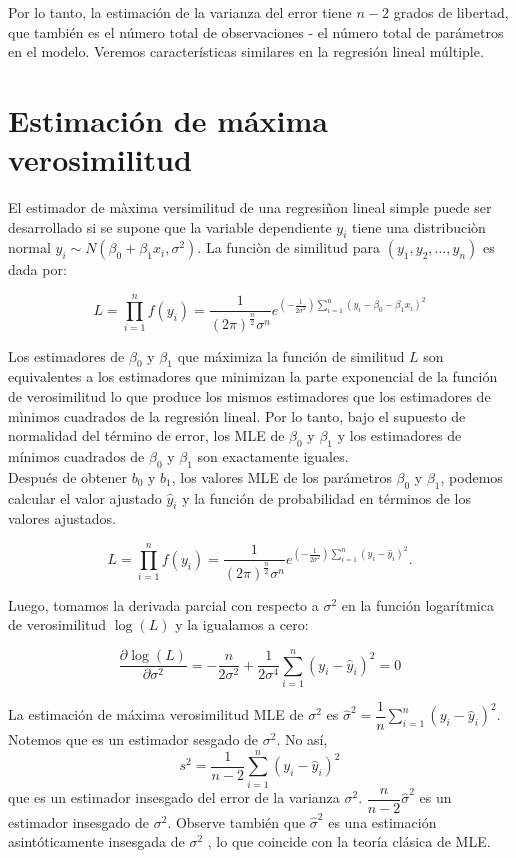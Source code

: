 Por lo tanto, la estimación de la varianza del error tiene $n - 2$ grados de libertad, que también es el número total de observaciones - el número total de parámetros en el modelo. Veremos características similares en la regresión lineal múltiple.


\section{Estimación de máxima verosimilitud}

El estimador de màxima versimilitud de una regresiñon lineal simple puede ser desarrollado si se supone que la variable dependiente $y_i$ tiene una distribuciòn normal $y_i\sim N\left(\beta_0+\beta_1x_i,\sigma^2\right)$. La funciòn de similitud para $\left(y_1,y_2,\ldots,y_n\right)$ es dada por:

$$L=\prod_{i=1}^n f\left(y_i\right)=\dfrac{1}{(2\pi)^{\frac{n}{2}}\sigma^n}e^{\left(-\frac{1}{2\sigma^2}\right)\sum\limits_{i=1}^n \left(y_i-\beta_0-\beta_1x_i\right)^2}$$

Los estimadores de $\beta_0$ y $\beta_1$ que máximiza la función de similitud $L$ son equivalentes a los estimadores que minimizan la parte exponencial de la función de verosimilitud lo que produce los mismos estimadores que los estimadores de mìnimos cuadrados de la regresión lineal. Por lo tanto, bajo el supuesto de normalidad del término de error, los MLE de $\beta_0$ y $\beta_1$ y los estimadores de mínimos cuadrados de $\beta_0$ y $\beta_1$ son exactamente iguales.\\

Después de obtener $b_0$ y $b_1$, los valores MLE de los parámetros $\beta_0$ y $\beta_1$, podemos calcular el valor ajustado $\hat{y}_i$ y la función de probabilidad en términos de los valores ajustados.

$$L=\prod_{i=1}^n f\left(y_i\right)=\dfrac{1}{(2\pi)^{\frac{n}{2}}\sigma^n}e^{\left(-\frac{1}{2\sigma^2}\right)\sum\limits_{i=1}^n \left(y_i-\hat{y}_i\right)^2}.$$

Luego, tomamos la derivada parcial con respecto a $\sigma^2$ en la función logarítmica de verosimilitud $\log(L)$ y la igualamos a cero:

$$\dfrac{\partial \log(L)}{\partial \sigma^2}=-\dfrac{n}{2\sigma^2}+\dfrac{1}{2\sigma^4}\sum_{i=1}^n \left(y_i-\hat{y}_i\right)^2=0$$

La estimación de máxima verosimilitud MLE de $\sigma^2$ es $\hat{\sigma}^2=\dfrac{1}{n}\displaystyle\sum_{i=1}^n\left(y_i-\hat{y}_i\right)^2$. Notemos que es un estimador sesgado de $\sigma^2$. No así, 
$$s^2=\dfrac{1}{n-2}\displaystyle\sum_{i=1}^n\left(y_i-\hat{y}_i\right)^2$$ 
que es un estimador insesgado del error de la varianza $\sigma^2$. $\dfrac{n}{n-2}\hat{\sigma}^2$ es un estimador insesgado de $\sigma^2$. Observe también  que $\hat{\sigma}^2$ es una estimación asintóticamente insesgada de $\sigma^2$ , lo que coincide con la teoría clásica de MLE.


